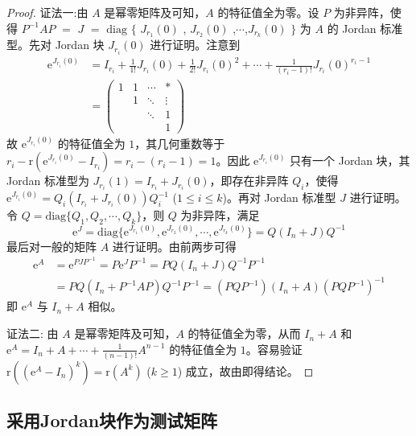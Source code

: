 \documentclass[../../main.tex]{subfiles}
\begin{document}
\begin{proof}
{\color{blue}证法一:}由 $A$ 是幂零矩阵及可知，$A$ 的特征值全为零。设 $P$ 为非异阵，使得 $P^{-1}AP$ $=$ $J$ $=$ $\mathrm{diag}$ $\{$ $J_{r_1}(0)$ , $J_{r_2}(0)$ ,$\cdots$,$J_{r_k}(0)$ $\}$ 为 $A$ 的 Jordan 标准型。先对 Jordan 块 $J_{r_i}(0)$ 进行证明。注意到
\begin{align*}
\mathrm{e}^{J_{r_i}(0)} &= I_{r_i}+\frac{1}{1!}J_{r_i}(0)+\frac{1}{2!}J_{r_i}(0)^2+\cdots+\frac{1}{(r_i - 1)!}J_{r_i}(0)^{r_i - 1}\\
&= 
\begin{pmatrix}
1 & 1 & \cdots & * \\
& 1 & \ddots & \vdots \\
& & \ddots & 1 \\
& & & 1
\end{pmatrix}
\end{align*}
故 $\mathrm{e}^{J_{r_i}(0)}$ 的特征值全为 $1$，其几何重数等于 $r_i - \mathrm{r}(\mathrm{e}^{J_{r_i}(0)}-I_{r_i}) = r_i - (r_i - 1) = 1$。因此 $\mathrm{e}^{J_{r_i}(0)}$ 只有一个 Jordan 块，其 Jordan 标准型为 $J_{r_i}(1) = I_{r_i}+J_{r_i}(0)$，即存在非异阵 $Q_i$，使得 $\mathrm{e}^{J_{r_i}(0)} = Q_i(I_{r_i}+J_{r_i}(0))Q_i^{-1}$ ($1\leq i\leq k$)。再对 Jordan 标准型 $J$ 进行证明。令 $Q = \mathrm{diag}\{Q_1,Q_2,\cdots,Q_k\}$，则 $Q$ 为非异阵，满足
\[
\mathrm{e}^J = \mathrm{diag}\{\mathrm{e}^{J_{r_1}(0)},\mathrm{e}^{J_{r_2}(0)},\cdots,\mathrm{e}^{J_{r_k}(0)}\} = Q(I_n + J)Q^{-1}
\]
最后对一般的矩阵 $A$ 进行证明。由前两步可得
\begin{align*}
\mathrm{e}^A &= \mathrm{e}^{PJP^{-1}} = P\mathrm{e}^JP^{-1} = PQ(I_n + J)Q^{-1}P^{-1}\\
&= PQ(I_n + P^{-1}AP)Q^{-1}P^{-1} = (PQP^{-1})(I_n + A)(PQP^{-1})^{-1}
\end{align*}
即 $\mathrm{e}^A$ 与 $I_n + A$ 相似。

{\color{blue}证法二:}
由 $A$ 是幂零矩阵及可知，$A$ 的特征值全为零，从而 $I_n + A$ 和 $\mathrm{e}^A = I_n+A+\cdots+\frac{1}{(n - 1)!}A^{n - 1}$ 的特征值全为 $1$。容易验证 $\mathrm{r}((\mathrm{e}^A - I_n)^k) = \mathrm{r}(A^k)$ ($k\geq 1$) 成立，故由即得结论。
\end{proof}


\subsection{采用Jordan块作为测试矩阵}
\end{document}

